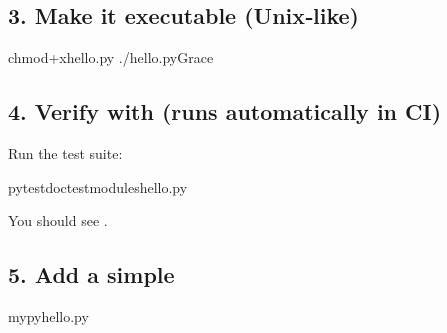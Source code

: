 \documentclass[a4paper,11pt,english]{sphinxmanual}
\begin{document}
\subsection{3. Make it executable (Unix‑like)}
\label{\detokenize{getting_started/first_program:make-it-executable-unixlike}}
\begin{sphinxVerbatim}[commandchars=\\\{\}]
chmod+xhello.py
./hello.pyGrace
\end{sphinxVerbatim}


\subsection{4. Verify with  (runs automatically in CI)}
\label{\detokenize{getting_started/first_program:verify-with-doctest-runs-automatically-in-ci}}
\begin{sphinxVerbatim}[commandchars=\\\{\}]
 
\end{sphinxVerbatim}

\sphinxAtStartPar
Run the test suite:

\begin{sphinxVerbatim}[commandchars=\\\{\}]
pytest\PYGZhy{}\PYGZhy{}doctest\PYGZhy{}moduleshello.py
\end{sphinxVerbatim}

\sphinxAtStartPar
You should see .


\subsection{5. Add a simple }
\label{\detokenize{getting_started/first_program:add-a-simple-typecheck}}
\begin{sphinxVerbatim}[commandchars=\\\{\}]
mypyhello.py
\end{sphinxVerbatim}
\end{document}
